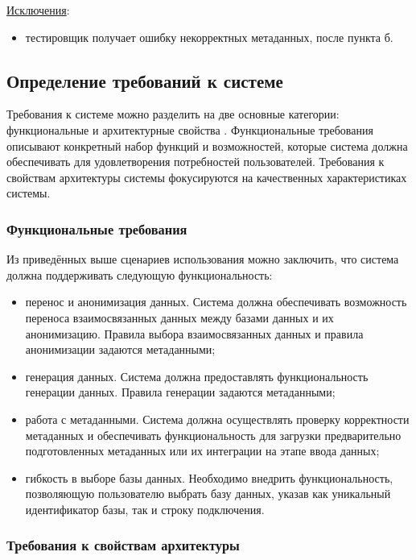 \underline{Исключения}:

\begin{itemize}
    \item тестировщик получает ошибку некорректных метаданных, после пункта б.
\end{itemize}


\subsection{Определение требований к системе}

Требования к системе можно разделить на две основные категории: функциональные и архитектурные свойства \cite{arch-requirements}. Функциональные требования описывают конкретный набор функций и возможностей, которые система должна обеспечивать для удовлетворения потребностей пользователей. Требования к свойствам архитектуры системы фокусируются на качественных характеристиках системы.

\subsubsection{Функциональные требования}

Из приведённых выше сценариев использования можно заключить, что система должна поддерживать следующую функциональность:

\begin{itemize}
    \item перенос и анонимизация данных. Система должна обеспечивать возможность переноса взаимосвязанных данных между базами данных и их анонимизацию. Правила выбора взаимосвязанных данных и правила анонимизации задаются метаданными;
    \item генерация данных. Система должна предоставлять функциональность генерации данных. Правила генерации задаются метаданными;
    \item работа с метаданными. Система должна осуществлять проверку корректности метаданных и обеспечивать функциональность для загрузки предварительно подготовленных метаданных или их интеграции на этапе ввода данных;
    \item гибкость в выборе базы данных. Необходимо внедрить функциональность, позволяющую пользователю выбрать базу данных, указав как уникальный идентификатор базы, так и строку подключения.
\end{itemize}

\subsubsection{Требования к свойствам архитектуры}

